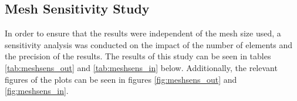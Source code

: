 \documentclass[11pt,a4paper,twoside,oneside]{article}
\begin{document}
\subsection{Mesh Sensitivity Study}
\vspace{0.3cm}
In order to ensure that the results were independent of the mesh size used, a sensitivity analysis was conducted on the impact of the number of elements and the precision of the results. The results of this study can be seen in tables \ref{tab:meshsens_out} and \ref{tab:meshsens_in} below. Additionally, the relevant figures of the plots can be seen in figures \ref{fig:meshsens_out} and \ref{fig:meshsens_in}.\\

\setcounter{table}{0}
\begin{table}[!ht]
\centering
\caption{Mesh Sensitivity data for external flow}
\label{tab:meshsens_out}
\end{table}
\end{document}
